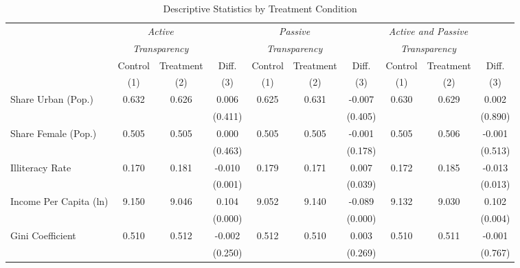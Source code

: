 \begin{table}[!htbp]
\centering
\caption{Descriptive Statistics by Treatment Condition}
\label{tab:descriptivestats3}
\scriptsize
\begin{tabular}{@{\extracolsep{-4pt}}l@{\extracolsep{-3pt}}ccccccccc}
\hline
\hline
& \multicolumn{2}{c}{\emph{Active}} & & \multicolumn{2}{c}{\emph{Passive}} & & \multicolumn{2}{c}{\emph{Active and Passive}} \T \\
& \multicolumn{2}{c}{\emph{Transparency}} & & \multicolumn{2}{c}{\emph{Transparency}} & & \multicolumn{2}{c}{\emph{Transparency}} \B \\
\cline{2-3} \cline{5-6} \cline{8-9}
& Control & Treatment & Diff. & Control & Treatment & Diff. & Control & Treatment & Diff. \T \B \\
& (1) & (2) & (3) & (1) & (2) & (3) & (1) & (2) & (3) \B \\
\hline
Share Urban (Pop.)                   & 0.632 & 0.626 & 0.006   & 0.625 & 0.631 & -0.007  & 0.630 & 0.629 & 0.002   \T \\
                                     &       &       & (0.411) &       &       & (0.405) &       &       & (0.890)    \\
Share Female (Pop.)                  & 0.505 & 0.505 & 0.000   & 0.505 & 0.505 & -0.001  & 0.505 & 0.506 & -0.001     \\
                                     &       &       & (0.463) &       &       & (0.178) &       &       & (0.513)    \\
Illiteracy Rate                      & 0.170 & 0.181 & -0.010  & 0.179 & 0.171 & 0.007   & 0.172 & 0.185 & -0.013     \\
                                     &       &       & (0.001) &       &       & (0.039) &       &       & (0.013)    \\
Income Per Capita (ln)               & 9.150 & 9.046 & 0.104   & 9.052 & 9.140 & -0.089  & 9.132 & 9.030 & 0.102      \\
                                     &       &       & (0.000) &       &       & (0.000) &       &       & (0.004)    \\
Gini Coefficient                     & 0.510 & 0.512 & -0.002  & 0.512 & 0.510 & 0.003   & 0.510 & 0.511 & -0.001     \\
                                     &       &       & (0.250) &       &       & (0.269) &       &       & (0.767)    \\

\end{tabular}
\end{table}

